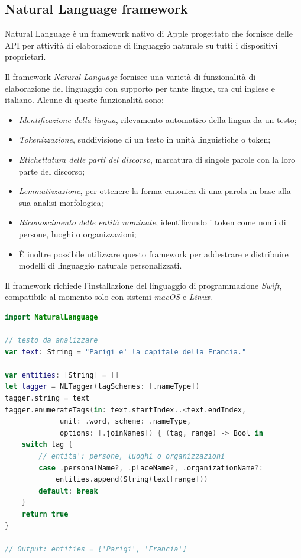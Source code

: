 \documentclass[a4paper,11pt]{article}
\begin{document}
\subsection{Natural Language framework}
\label{extractor:nl}
Natural Language è un framework nativo di Apple progettato che fornisce delle API per attività di elaborazione di linguaggio naturale su tutti i dispositivi proprietari. \cite{nl}

Il framework \textit{Natural Language} fornisce una varietà di funzionalità di elaborazione del linguaggio con supporto per tante lingue, tra cui inglese e italiano. Alcune di queste funzionalità sono:
\begin{itemize}
	\item \textit{Identificazione della lingua}, rilevamento automatico della lingua da un testo;
	\item \textit{Tokenizzazione}, suddivisione di un testo in unità linguistiche o token;
	\item \textit{Etichettatura delle parti del discorso}, marcatura di singole parole con la loro parte del discorso;
	\item \textit{Lemmatizzazione}, per ottenere la forma canonica di una parola in base alla sua analisi morfologica;
	\item \textit{Riconoscimento delle entità nominate}, identificando i token come nomi di persone, luoghi o organizzazioni;
	\item È inoltre possibile utilizzare questo framework per addestrare e distribuire modelli di linguaggio naturale personalizzati.\newline
\end{itemize}

Il framework richiede l'installazione del linguaggio di programmazione \textit{Swift}, compatibile al momento solo con sistemi \textit{macOS} e \textit{Linux}.

\clearpage
\begin{lstlisting}[basicstyle=\small, language=swift, frame=single, caption={Esempio di codice Swift per l'estrazione di entità tramite il framework \textit{Natural Language}.},captionpos=b]
import NaturalLanguage

// testo da analizzare
var text: String = "Parigi e' la capitale della Francia."

var entities: [String] = []
let tagger = NLTagger(tagSchemes: [.nameType])
tagger.string = text
tagger.enumerateTags(in: text.startIndex..<text.endIndex, 
		     unit: .word, scheme: .nameType, 
		     options: [.joinNames]) { (tag, range) -> Bool in
    switch tag {
        // entita': persone, luoghi o organizzazioni
        case .personalName?, .placeName?, .organizationName?:
            entities.append(String(text[range]))
        default: break
    }
    return true
}

// Output: entities = ['Parigi', 'Francia']
\end{lstlisting}
\end{document}

